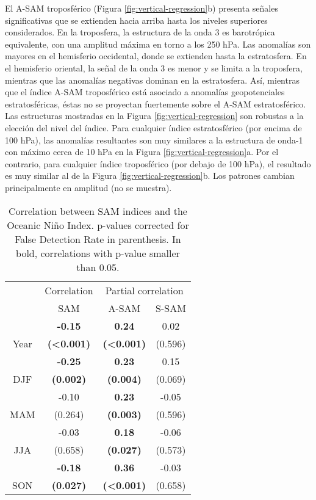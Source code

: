 \documentclass[12pt,oneside]{reedthesis}
\begin{document}
El A\nobreakdash-SAM troposférico (Figura \ref{fig:vertical-regression}b) presenta señales significativas que se extienden hacia arriba hasta los niveles superiores considerados.
En la troposfera, la estructura de la onda 3 es barotrópica equivalente, con una amplitud máxima en torno a los 250 hPa.
Las anomalías son mayores en el hemisferio occidental, donde se extienden hasta la estratosfera.
En el hemisferio oriental, la señal de la onda 3 es menor y se limita a la troposfera, mientras que las anomalías negativas dominan en la estratosfera.
Así, mientras que el índice A\nobreakdash-SAM troposférico está asociado a anomalías geopotenciales estratosféricas, éstas no se proyectan fuertemente sobre el A\nobreakdash-SAM estratosférico.
Las estructuras mostradas en la Figura \ref{fig:vertical-regression} son robustas a la elección del nivel del índice.
Para cualquier índice estratosférico (por encima de 100 hPa), las anomalías resultantes son muy similares a la estructura de onda-1 con máximo cerca de 10 hPa en la Figura \ref{fig:vertical-regression}a.
Por el contrario, para cualquier índice troposférico (por debajo de 100 hPa), el resultado es muy similar al de la Figura \ref{fig:vertical-regression}b.
Los patrones cambian principalmente en amplitud (no se muestra).
\begin{table}

\caption{\label{tab:enso-cor-table}Correlation between SAM indices and the Oceanic Niño Index. p-values corrected for False Detection Rate in parenthesis. In bold, correlations with p-value smaller than 0.05.}
\centering
\begin{tabular}[t]{c>{}c>{}c>{}c}
\toprule
\multicolumn{1}{c}{ } & \multicolumn{1}{c}{Correlation} & \multicolumn{2}{c}{Partial correlation} \\
\cmidrule(l{3pt}r{3pt}){2-2} \cmidrule(l{3pt}r{3pt}){3-4}
 & SAM & A-SAM & S-SAM\\
\midrule
 & \textbf{-0.15} & \textbf{0.24} & 0.02\\
\cmidrule{2-4}
\multirow[t]{-2}{*}{\centering\arraybackslash Year} & \textbf{(<0.001)} & \textbf{(<0.001)} & (0.596)\\
\cmidrule{1-4}
 & \textbf{-0.25} & \textbf{0.23} & 0.15\\
\cmidrule{2-4}
\multirow[t]{-2}{*}{\centering\arraybackslash DJF} & \textbf{(0.002)} & \textbf{(0.004)} & (0.069)\\
\cmidrule{1-4}
 & -0.10 & \textbf{0.23} & -0.05\\
\cmidrule{2-4}
\multirow[t]{-2}{*}{\centering\arraybackslash MAM} & (0.264) & \textbf{(0.003)} & (0.596)\\
\cmidrule{1-4}
 & -0.03 & \textbf{0.18} & -0.06\\
\cmidrule{2-4}
\multirow[t]{-2}{*}{\centering\arraybackslash JJA} & (0.658) & \textbf{(0.027)} & (0.573)\\
\cmidrule{1-4}
 & \textbf{-0.18} & \textbf{0.36} & -0.03\\
\cmidrule{2-4}
\multirow[t]{-2}{*}{\centering\arraybackslash SON} & \textbf{(0.027)} & \textbf{(<0.001)} & (0.658)\\
\bottomrule
\end{tabular}
\end{table}
\end{document}
